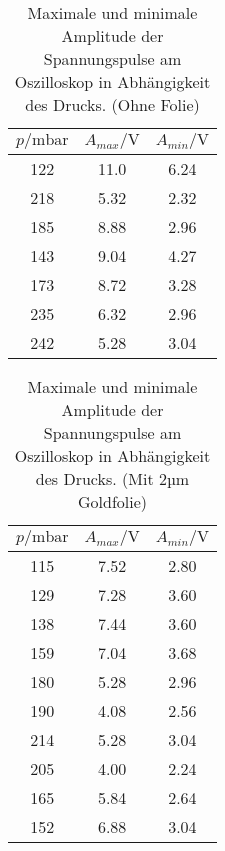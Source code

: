 \begin{table}
    \centering
    \caption{Maximale und minimale Amplitude der Spannungspulse am Oszilloskop in Abhängigkeit des Drucks. (Ohne Folie)}
    \label{tab:dichteprofil}
    \begin{tabular}{ccc}
        \toprule
        $p/\si{\milli\bar}$ &$A_{max}/\si{\volt}$ & $A_{min}/\si{\volt}$\\
        \midrule
        122 &11.0    &6.24\\
        218 &5.32    &2.32\\
        185 &8.88    &2.96\\
        143 &9.04    &4.27\\
        173 &8.72    &3.28\\
        235 &6.32    &2.96\\
        242 &5.28    &3.04\\
        \bottomrule
    \end{tabular}
\end{table}

\begin{table}
    \centering
    \caption{Maximale und minimale Amplitude der Spannungspulse am Oszilloskop in Abhängigkeit des Drucks. (Mit 2µm Goldfolie)}
    \label{tab:dichteprofil_Au}
    \begin{tabular}{ccc}
        \toprule
        $p/\si{\milli\bar}$ &$A_{max}/\si{\volt}$ & $A_{min}/\si{\volt}$\\
        \midrule
        115 &7.52    &2.80\\
        129 &7.28    &3.60\\
        138 &7.44    &3.60\\
        159 &7.04    &3.68\\
        180 &5.28    &2.96\\
        190 &4.08    &2.56\\
        214 &5.28    &3.04\\
        205 &4.00    &2.24\\
        165 &5.84    &2.64\\
        152 &6.88    &3.04\\
        \bottomrule
    \end{tabular}
\end{table}

